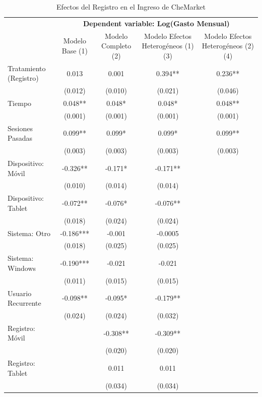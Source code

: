 \documentclass[conference]{IEEEtran}
\begin{document}
\begin{table}[H]
\tiny
\centering
\caption{Efectos del Registro en el Ingreso de CheMarket}
\label{tab:efectos_registro}
\begin{threeparttable}
\begin{tabular}{lcccc}
\toprule
 & \multicolumn{4}{c}{\textbf{Dependent variable: Log(Gasto Mensual)}} \\
\cmidrule(lr){2-5}
 & Modelo Base (1) & Modelo Completo (2) & Modelo Efectos Heterogéneos (1) (3) & Modelo Efectos Heterogéneos (2) (4) \\
\midrule
Tratamiento (Registro)      & 0.013 & 0.001 & 0.394** & 0.236** \\
                            & (0.012) & (0.010) & (0.021) & (0.046) \\
Tiempo                      & 0.048** & 0.048* & 0.048* & 0.048** \\
                            & (0.001) & (0.001) & (0.001) & (0.001) \\
Sesiones Pasadas            & 0.099** & 0.099* & 0.099* & 0.099** \\
                            & (0.003) & (0.003) & (0.003) & (0.003) \\
Dispositivo: Móvil          & -0.326** & -0.171* & -0.171** \\
                            & (0.010) & (0.014) & (0.014) \\
Dispositivo: Tablet         & -0.072** & -0.076* & -0.076** \\
                            & (0.018) & (0.024) & (0.024) \\
Sistema: Otro               & -0.186*** & -0.001 & -0.0005 \\
                            & (0.018) & (0.025) & (0.025) \\
Sistema: Windows            & -0.190*** & -0.021 & -0.021 \\
                            & (0.011) & (0.015) & (0.015) \\
Usuario Recurrente          & -0.098** & -0.095* & -0.179** \\
                            & (0.024) & (0.024) & (0.032) \\
Registro: Móvil             &         & -0.308** & -0.309** \\
                            &         & (0.020) & (0.020) \\
Registro: Tablet            &         & 0.011 & 0.011 \\
                            &         & (0.034) & (0.034) \\

\end{tabular}
\end{threeparttable}
\end{table}
\end{document}
